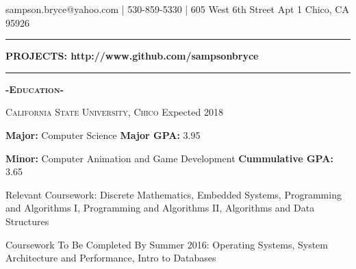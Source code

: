 \documentclass[12pt]{article}
\begin{document}
\fontsize{12}{1.2}
\selectfont

\noindent
sampson.bryce@yahoo.com | 530-859-5330 | 605 West 6th Street Apt 1 Chico, CA 95926

\noindent\rule{16.5cm}{0.4pt}
\begin{center}
\begin{Large}
\textbf{PROJECTS: \color{TealBlue}http://www.github.com/sampsonbryce}
\end{Large}
\end{center}

\noindent\rule{16.5cm}{0.4pt}
\smallskip
\center
\textbf{\textsc{-Education-}}\\
\flushleft
\begin{footnotesize}
\textsc{California State University, Chico}
\hfill
\color{gray}Expected 2018
\color{black}
\bigskip

\color{Cerulean}\textbf{Major: }\color{black}Computer Science
\hfill
\color{Cerulean}\textbf{Major GPA: }\color{black}3.95\\
\bigskip

\color{Cerulean}\textbf{Minor: }\color{black}Computer Animation and Game Development
\hfill
\color{Cerulean}\textbf{Cummulative GPA: }\color{black}3.65
\bigskip

\color{Cerulean}Relevant Coursework: \color{black} Discrete Mathematics, Embedded Systems,
Programming and Algorithms I, Programming and Algorithms II, Algorithms and Data Structures
\smallskip

\color{Cerulean}Coursework To Be Completed By Summer 2016: \color{black}Operating Systems, System Architecture and Performance, Intro to Databases
\end{footnotesize}

\bigskip
\end{document}

